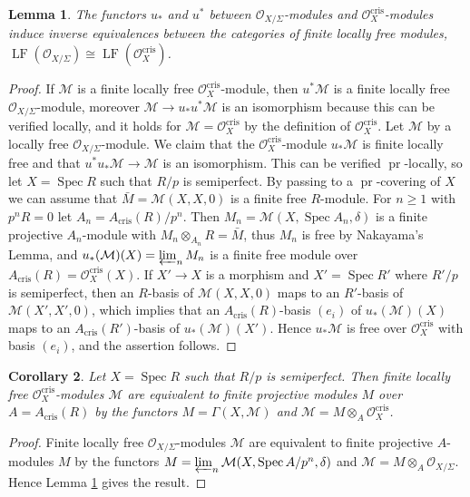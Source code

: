\documentclass[a4paper,11pt]{article}
\theoremstyle{plain}
\newtheorem{Lemma}{Lemma}
\newtheorem{Cor}[Lemma]{Corollary}
\theoremstyle{definition}
\theoremstyle{remark}
\theoremstyle{definition}
\numberwithin{Lemma}{section}
\numberwithin{Subpoint}{Lemma}
\numberwithin{equation}{section}
\newcommand{\MMM}{\mathcal{M}}
\newcommand{\OOO}{\mathcal{O}}
\DeclareMathOperator{\LF}{LF}
\DeclareMathOperator{\Spec}{Spec}
\DeclareMathOperator{\cris}{cris}
\newcommand{\nameoftop}{{\operatorname{pr}}}
\begin{document}
\begin{Lemma}
\label{Le:u**}
The functors $u_*$ and $u^*$ between $\OOO_{X/\Sigma}$-modules
and $\OOO_X^{\cris}$-modules induce inverse equivalences
between the categories of finite locally free modules,
$\LF(\OOO_{X/\Sigma})\cong\LF(\OOO_X^{\cris})$.
\end{Lemma}

\begin{proof}
If $\MMM$ is a finite locally free $\OOO_X^{\cris}$-module,
then $u^*\MMM$ is a finite locally free $\OOO_{X/\Sigma}$-module,
moreover $\MMM\to u_*u^*\MMM$ is an isomorphism because this can be verified locally,
and it holds for $\MMM=\OOO_X^{\cris}$ by the definition of $\OOO_X^{\cris}$.
Let $\MMM$ by a locally free $\OOO_{X/\Sigma}$-module.
We claim that the $\OOO_X^{\cris}$-module $u_*\MMM$ 
is finite locally free and that $u^*u_*\MMM\to \MMM$ is an isomorphism.
This can be verified $\nameoftop$-locally, 
so let $X=\Spec R$ such that $R/p$ is semiperfect.
By passing to a $\nameoftop$-covering of $X$ 
we can assume that $\bar M=\MMM(X,X,0)$ is a finite free $R$-module.
For $n\ge 1$ with $p^nR=0$ let $A_n=A_{\cris}(R)/p^n$.
Then $M_n=\MMM(X,\Spec A_n,\delta)$ is a finite projective $A_n$-module
with $M_n\otimes_{A_n}R=\bar M$,
thus $M_n$ is free by Nakayama's Lemma,
and $u_*(\MMM)(X)=\varprojlim_nM_n$ is a finite free 
module over $A_{\cris}(R)=\OOO^{\cris}_X(X)$.
If $X'\to X$ is a morphism and $X'=\Spec R'$ where $R'/p$ is semiperfect,
then an $R$-basis of $\MMM(X,X,0)$ maps to an $R'$-basis of $\MMM(X',X',0)$,
which implies that an $A_{\cris}(R)$-basis $(e_i)$ of $u_*(\MMM)(X)$ maps to an
$A_{\cris}(R')$-basis of $u_*(\MMM)(X')$.
Hence $u_*\MMM$ is free over $\OOO_X^{\cris}$ with basis $(e_i)$,
and the assertion follows.
\end{proof}

\begin{Cor}
\label{Co:Ocris-Acris}
Let $X=\Spec R$ such that $R/p$ is semiperfect.
Then finite locally free $\OOO_X^{\cris}$-modules $\MMM$
are equivalent to finite projective modules $M$ over $A=A_{\cris}(R)$
by the functors $M=\Gamma(X,\MMM)$ and $\MMM=M\otimes_A\OOO_X^{\cris}$.
\end{Cor}

\begin{proof}
Finite locally free $\OOO_{X/\Sigma}$-modules $\MMM$
are equivalent to finite projective $A$-modules $M$
by the functors $M=\varprojlim_n\MMM(X,\Spec A/p^n,\delta)$
and $\MMM=M\otimes_A\OOO_{X/\Sigma}$.
Hence Lemma \ref{Le:u**} gives the result.
\end{proof}
\end{document}
